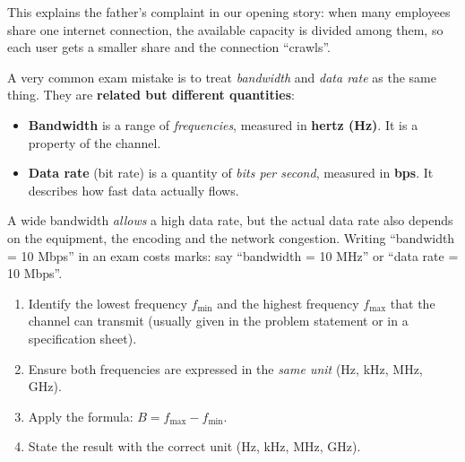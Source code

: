 \documentclass[11pt]{article}
\begin{document}
This explains the father's complaint in our opening story: when many employees share one internet connection, the available capacity is divided among them, so each user gets a smaller share and the connection ``crawls''.

\begin{attention}
A very common exam mistake is to treat \emph{bandwidth} and \emph{data rate} as the same thing. They are \textbf{related but different quantities}:
\begin{itemize}
\item \textbf{Bandwidth} is a range of \emph{frequencies}, measured in \textbf{hertz (Hz)}. It is a property of the channel.
\item \textbf{Data rate} (bit rate) is a quantity of \emph{bits per second}, measured in \textbf{bps}. It describes how fast data actually flows.
\end{itemize}
A wide bandwidth \emph{allows} a high data rate, but the actual data rate also depends on the equipment, the encoding and the network congestion. Writing ``bandwidth = 10 Mbps'' in an exam costs marks: say ``bandwidth = 10 MHz'' or ``data rate = 10 Mbps''.
\end{attention}

\begin{methode}
\begin{enumerate}
\item Identify the lowest frequency $f_{\min}$ and the highest frequency $f_{\max}$ that the channel can transmit (usually given in the problem statement or in a specification sheet).
\item Ensure both frequencies are expressed in the \emph{same unit} (Hz, kHz, MHz, GHz).
\item Apply the formula: $B = f_{\max} - f_{\min}$.
\item State the result with the correct unit (Hz, kHz, MHz, GHz).
\end{enumerate}
\end{methode}
\end{document}
